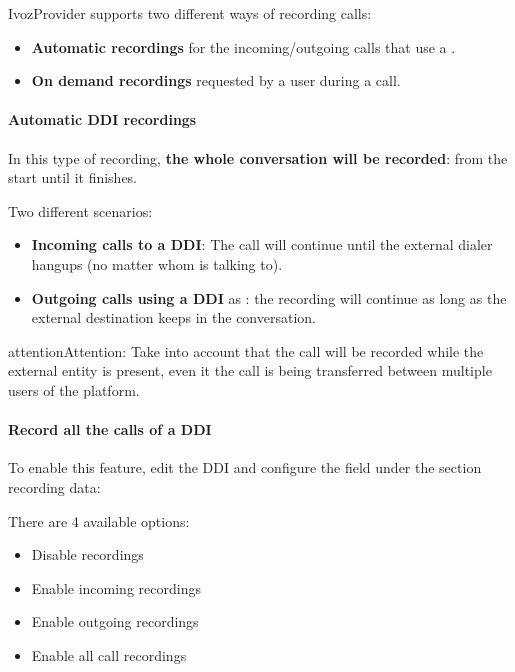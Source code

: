 \documentclass[letterpaper,10pt,english]{sphinxmanual}
\begin{document}
IvozProvider supports two different ways of recording calls:
\begin{itemize}
\item {} 
\textbf{Automatic recordings} for the incoming/outgoing calls that use a
{\hyperref[administration_portal/brand/views/ddis:ddis]{}}.

\item {} 
\textbf{On demand recordings} requested by a user during a call.

\end{itemize}


\paragraph{Automatic DDI recordings}
\label{administration_portal/client/vpbx/calls/call_recordings:automatic-ddi-recordings}
In this type of recording, \textbf{the whole conversation will be recorded}: from
the start until it finishes.

Two different scenarios:
\begin{itemize}
\item {} 
\textbf{Incoming calls to a DDI}: The call will continue until the external
dialer hangups (no matter whom is talking to).

\item {} 
\textbf{Outgoing calls using a DDI} as {\hyperref[administration_portal/brand/views/ddis:ddis]{}}: the
recording will continue as long as the external destination keeps in the
conversation.

\end{itemize}

\begin{notice}{attention}{Attention:}
Take into account that the call will be recorded while the
external entity is present, even it the call is being transferred between
multiple users of the platform.
\end{notice}
\paragraph{Record all the calls of a DDI}

To enable this feature, edit the DDI and configure the field under the section
recording data:

There are 4 available options:
\begin{itemize}
\item {} 
Disable recordings

\item {} 
Enable incoming recordings

\item {} 
Enable outgoing recordings

\item {} 
Enable all call recordings

\end{itemize}
\end{document}
